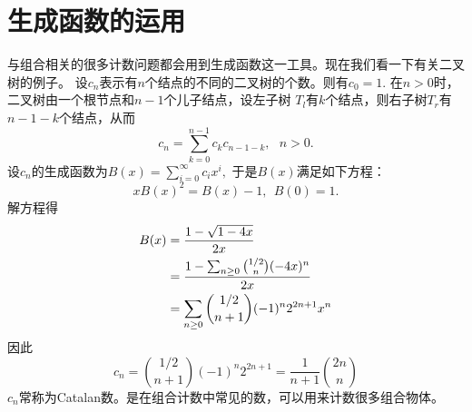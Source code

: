 \documentclass[a4paper,11pt,twoside]{book}
\begin{document}
\section{生成函数的运用}
与组合相关的很多计数问题都会用到生成函数这一工具。现在我们看一下有关二叉树的例子。
设$c_n$表示有$n$个结点的不同的二叉树的个数。则有$c_0=1.$ 在$n>0$时，二叉树由一个根节点和$n-1$个儿子结点，设左子树
$T_l$有$k$个结点，则右子树$T_r$有$n-1-k$个结点，从而
$$c_n=\sum_{k=0}^{n-1}c_kc_{n-1-k},\ \ \ n>0.$$
设$c_n$的生成函数为$B(x)=\sum_{i=0}^{\infty}c_ix^i,$ 于是$B(x)$满足如下方程：
$$xB(x)^2=B(x)-1,\ \ B(0)=1.$$
解方程得
\begin{align}
B(x)&=\frac{1-\sqrt{1-4x}}{2x}\notag\\
&=\frac{1-\sum_{n\geq 0}{1/2\choose n}(-4x)^n}{2x}\notag\\
&=\sum_{n\geq 0}{1/2\choose n+1}(-1)^n2^{2n+1}x^n\notag
\end{align}
因此
$$c_n={1/2\choose n+1}(-1)^n2^{2n+1}=\frac{1}{n+1}{2n\choose n}$$
$c_n$常称为Catalan数。是在组合计数中常见的数，可以用来计数很多组合物体。
\end{document}
